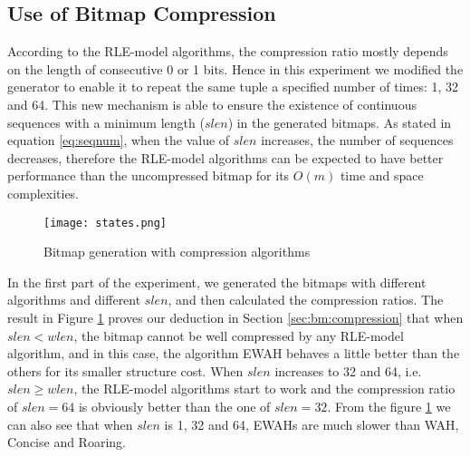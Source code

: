 
\subsection{Use of Bitmap Compression} %

According to the RLE-model algorithms, the compression ratio mostly depends on the length of consecutive 0 or 1 bits. Hence in this experiment we modified the generator to enable it to repeat the same tuple a specified number of times: 1, 32 and 64. This new mechanism is able to ensure the existence of continuous sequences with a minimum length ($slen$) in the generated bitmaps. As stated in equation \eqref{eq:seqnum}, when the value of $slen$ increases, the number of sequences decreases, therefore the RLE-model algorithms can be expected to have better performance than the uncompressed bitmap for its $O(m)$ time and space complexities.

\begin{figure}[h]
\begin{center}
\centering
\texttt{[image: states.png]}
\caption{Bitmap generation with compression algorithms}
\label{img:states}
\end{center}
\end{figure}

In the first part of the experiment, we generated the bitmaps with different algorithms and different $slen$, and then calculated the compression ratios. The result in Figure \ref{img:states} proves our deduction in Section \ref{sec:bm:compression} that when $slen < wlen$, the bitmap cannot be well compressed by any RLE-model algorithm, and in this case, the algorithm EWAH behaves a little better than the others for its smaller structure cost. When $slen$ increases to 32 and 64, i.e. $slen \geq wlen$, the RLE-model algorithms start to work and the compression ratio of $slen = 64$ is obviously better than the one of $slen = 32$. From the figure \ref{img:states} we can also see that when $slen$ is 1, 32 and 64, EWAHs are much slower than WAH, Concise and Roaring.

\begin{comment}
The result in Figure \ref{img:ratio} shows that when the length of consecutive bits is small ($\leq 5$), there is no great gap of the ratio among the RLE-model algorithms, Roaring bitmap and even uncompressed bitmap. The word lengths of WAH, Concise, EWAH(32bit), EWAH(64bit) are 32, 32, 32 and 64, so when the length grows beyond 50, which is over 32 and slightly less than 64, the ratios increase dramatically. The compression ratio of Roaring bitmap depends on the fraction of 1s bits in the bitmap, when the bitmap is not very sparse, the algorithm has to allocate much memory for its containers which in our opinion is the reason that its compression ratio is near 1 (uncompressed).
\end{comment}

